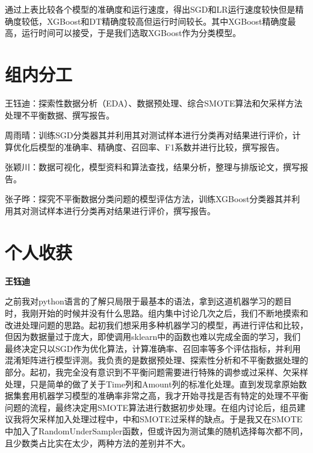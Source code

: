 \documentclass[a4paper,12pt]{article}
\begin{document}
\begin{table}[htb]
	\caption{评分结果和运行时间}
\end{table}

通过上表比较各个模型的准确度和运行速度，得出SGD和LR运行速度较快但是精确度较低，XGBoost和DT精确度较高但运行时间较长。其中XGBoost精确度最高，运行时间可以接受，于是我们选取XGBoost作为分类模型。
\section{组内分工}
王钰迪：探索性数据分析（EDA）、数据预处理、综合SMOTE算法和欠采样方法处理不平衡数据、撰写报告。

周雨晴：训练SGD分类器其并利用其对测试样本进行分类再对结果进行评价，计算优化后模型的准确率、精确度、召回率、F1系数并进行比较，撰写报告。

张颖川：数据可视化，模型资料和算法查找，结果分析，整理与排版论文，撰写报告。

张子晔：探究不平衡数据分类问题的模型评估方法，训练XGBoost分类器其并利用其对测试样本进行分类再对结果进行评价，撰写报告。
\section{个人收获}
\textbf{王钰迪}

之前我对python语言的了解只局限于最基本的语法，拿到这道机器学习的题目时，我刚开始的时候并没有什么思路。组内集中讨论几次之后，我们不断地摸索和改进处理问题的思路。起初我们想采用多种机器学习的模型，再进行评估和比较，但因为数据量过于庞大，即使调用sklearn中的函数也难以完成全面的学习，我们最终决定只以SGD作为优化算法，计算准确率、召回率等多个评估指标，并利用混淆矩阵进行模型评测。我负责的是数据预处理、探索性分析和不平衡数据处理的部分。起初，我完全没有意识到不平衡问题需要进行特殊的调参或过采样、欠采样处理，只是简单的做了关于Time列和Amount列的标准化处理。直到发现拿原始数据集套用机器学习模型的准确率非常之高，我才开始寻找是否有特定的处理不平衡问题的流程，最终决定用SMOTE算法进行数据初步处理。在组内讨论后，组员建议我将欠采样加入处理过程中，中和SMOTE过采样的缺点。于是我又在SMOTE中加入了RandomUnderSampler函数，但或许因为测试集的随机选择每次都不同，且少数类占比实在太少，两种方法的差别并不大。
\end{document}
